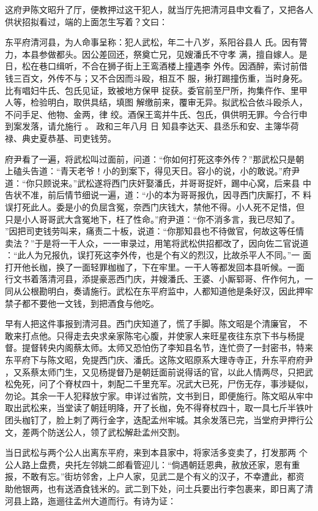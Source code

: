 这府尹陈文昭升了厅，便教押过这干犯人，就当厅先把清河县申文看了，又把各人
供状招拟看过，端的上面怎生写着？文曰：

东平府清河县，为人命事呈称：犯人武松，年二十八岁，系阳谷县人
氏。因有膂力，本县参做都头。因公差回还，祭奠亡兄，见嫂潘氏不守孝
满，擅自嫁人。是日，松在巷口缉听，不合在狮子街上王鸾酒楼上撞遇李
外传。因酒醉，索讨前借钱三百文，外传不与；又不合因而斗殴，相互不
服，揪打踢撞伤重，当时身死。比有唱妇牛氏、包氏见证，致被地方保甲
捉获。委官前至尸所，拘集仵作、里甲人等，检验明白，取供具结，填图
解缴前来，覆审无异。拟武松合依斗殴杀人，不问手足、他物、金两，律
绞。酒保王鸾并牛氏、包氏，俱供明无罪。今合行申到案发落，请允施行
。
政和三年八月 日        知县李达天、县丞乐和安、主簿华荷
禄、典史夏恭基、司吏钱劳。

府尹看了一遍，将武松叫过面前，问道：“你如何打死这李外传？”那武松只是朝
上磕头告道：“青天老爷！小的到案下，得见天日。容小的说，小的敢说。”府尹
道：“你只顾说来。”武松遂将西门庆奸娶潘氏，并哥哥捉奸，踢中心窝，后来县
中告状不准，前后情节细说一遍，道：“小的本为哥哥报仇，因寻西门庆厮打，不
料误打死此人。委是小的负屈含冤，奈西门庆钱大，禁他不得。小人死不足惜，但
只是小人哥哥武大含冤地下，枉了性命。”府尹道：“你不消多言，我已尽知了。
”因把司吏钱劳叫来，痛责二十板，说道：“你那知县也不待做官，何故这等任情
卖法？”于是将一干人众，一一审录过，用笔将武松供招都改了，因向佐二官说道
：“此人为兄报仇，误打死这李外传，也是个有义的烈汉，比故杀平人不同。”一
面打开他长枷，换了一面轻罪枷枷了，下在牢里。一干人等都发回本县听候。一面
行文书着落清河县，添提豪恶西门庆，并嫂潘氏、王婆、小厮郓哥、仵作何九，一
同从公根勘明白，奏请施行。武松在东平府监中，人都知道他是条好汉，因此押牢
禁子都不要他一文钱，到把酒食与他吃。

早有人把这件事报到清河县。西门庆知道了，慌了手脚。陈文昭是个清廉官，
不敢来打点他。只得走去央求亲家陈宅心腹，并使家人来旺星夜往东京下书与杨提
督。提督转央内阁蔡太师。太师又恐怕伤了李知县名节，连忙赍了一封密书，特来
东平府下与陈文昭，免提西门庆、潘氏。这陈文昭原系大理寺寺正，升东平府府尹
，又系蔡太师门生，又见杨提督乃是朝廷面前说得话的官，以此人情两尽，只把武
松免死，问了个脊杖四十，刺配二千里充军。况武大已死，尸伤无存，事涉疑似，
勿论。其余一干人犯释放宁家。申详过省院，文书到日，即便施行。陈文昭从牢中
取出武松来，当堂读了朝廷明降，开了长枷，免不得脊杖四十，取一具七斤半铁叶
团头枷钉了，脸上刺了两行金字，迭配孟州牢城。其余发落已完，当堂府尹押行公
文，差两个防送公人，领了武松解赴孟州交割。

当日武松与两个公人出离东平府，来到本县家中，将家活多变卖了，打发那两
个公人路上盘费，央托左邻姚二郎看管迎儿：“倘遇朝廷恩典，赦放还家，恩有重
报，不敢有忘。”街坊邻舍，上户人家，见武二是个有义的汉子，不幸遭此，都资
助他银两，也有送酒食钱米的。武二到下处，问土兵要出行李包裹来，即日离了清
河县上路，迤逦往孟州大道而行。有诗为证：

